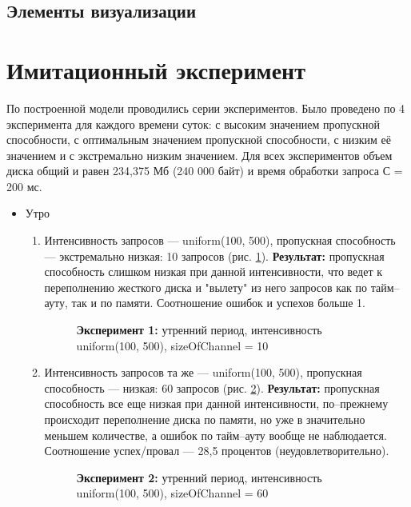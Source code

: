 \subsection{Элементы визуализации}

\newpage
\section{Имитационный эксперимент}
По построенной модели проводились серии экспериментов. Было проведено по 4 эксперимента для
каждого времени суток: с высоким значением пропускной способности, с оптимальным значением
пропускной способности, с низким её значением и с экстремально низким значением. Для всех
экспериментов объем диска общий и равен 234,375 Мб (240 000 байт) и время обработки запроса С = 200 мс.
\begin{itemize}
    \item Утро
    \begin{enumerate}
        \item Интенсивность запросов --- uniform(100, 500), пропускная способность --- экстремально низкая:
        10 запросов (рис. \ref{mor1}). \textbf{Результат:} пропускная способность слишком низкая при данной интенсивности,
        что ведет к переполнению жесткого диска и "вылету" из него запросов как по тайм--ауту, так и по памяти.
        Соотношение ошибок и успехов больше 1. 
        \begin{figure} [h]
            \caption{\textbf{Эксперимент 1:} утренний период, интенсивность uniform(100, 500), sizeOfChannel = 10}
            \label{mor1}
        \end{figure}

        \item Интенсивность запросов та же --- uniform(100, 500), пропускная способность --- низкая: 60 запросов
        (рис. \ref{mor2}). \textbf{Результат:} пропускная способность все еще низкая при данной интенсивности, по--прежнему
        происходит переполнение диска по памяти, но уже в значительно меньшем количестве, а ошибок по
        тайм--ауту вообще не наблюдается. Соотношение успех/провал --- 28,5 процентов (неудовлетворительно).
        \begin{figure} [h]
            \caption{\textbf{Эксперимент 2:} утренний период, интенсивность uniform(100, 500), sizeOfChannel = 60}
            \label{mor2}
        \end{figure}


\end{enumerate}
\end{itemize}
